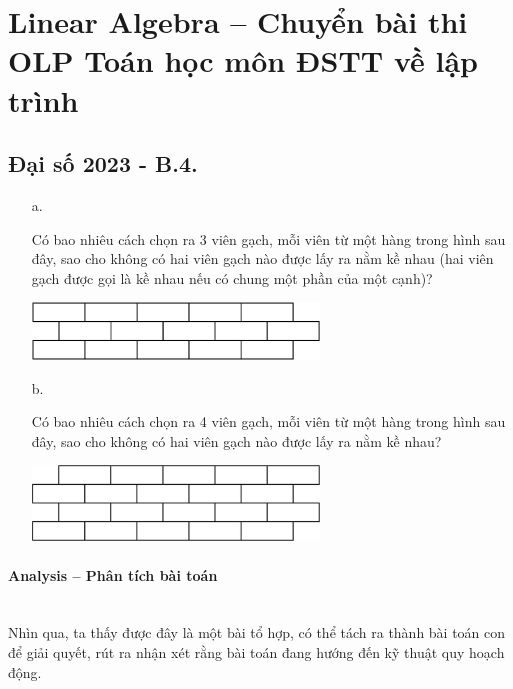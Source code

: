 \documentclass{article}
\begin{document}
\section{Linear Algebra -- Chuyển bài thi OLP Toán học môn ĐSTT về lập trình}

\subsection{Đại số 2023 - B.4.}
    \begin{enumerate}
        \item[a.] {Có bao nhiêu cách chọn ra 3 viên gạch, mỗi viên từ một hàng trong hình sau đây, sao cho không có hai viên gạch nào được lấy ra nằm kề nhau (hai viên gạch được gọi là kề nhau nếu có chung một phần của một cạnh)?
        
        \begin{center}
            \includegraphics[width=0.6\textwidth]{Figures/01.png}
        \end{center}}
        \item[b.] {Có bao nhiêu cách chọn ra 4 viên gạch, mỗi viên từ một hàng trong hình sau đây, sao cho không có hai viên gạch nào được lấy ra nằm kề nhau?
        
        \begin{center}
            \includegraphics[width=0.6\textwidth]{Figures/02.png}
        \end{center}}
    \end{enumerate}

\paragraph{Analysis -- Phân tích bài toán} \mbox{} \\

Nhìn qua, ta thấy được đây là một bài tổ hợp, có thể tách ra thành bài toán con để giải quyết, rút ra nhận xét rằng bài toán đang hướng đến kỹ thuật quy hoạch động. \\
\end{document}
